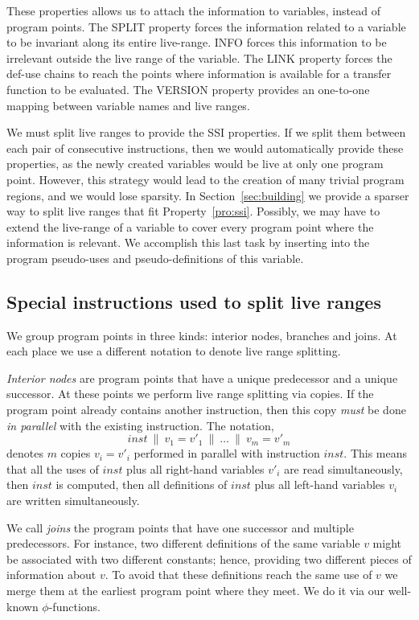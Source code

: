 These properties allows us to attach the information to variables, instead of program points.
The {SPLIT} property forces the information related to a variable to be invariant along its entire live-range.
{INFO} forces this information to be irrelevant outside the live range of the variable.
The {LINK} property forces the def-use chains to reach the points where information is available for a transfer function to be evaluated.
The {VERSION} property provides an one-to-one mapping between variable names and live ranges.

We must split live ranges to provide the SSI properties.
If we split them between each pair of consecutive instructions, then we would automatically provide these properties, as the newly created variables
would be live at only one program point.
However, this strategy would lead to the creation of many trivial program regions, and we would lose sparsity.
In Section~\ref{sec:building} we provide a sparser way to split live ranges that fit Property~\ref{pro:ssi}.
Possibly, we may have to extend the live-range of a variable to cover every program point where the information is relevant.
We accomplish this last task by inserting into the program pseudo-uses and pseudo-definitions of this variable.

\subsection{Special instructions used to split live ranges}
\label{sub:split}

We group program points in three kinds:
interior nodes, branches and joins.
At each place we use a different notation to denote live range splitting.

{\em Interior nodes} are program points that have a unique predecessor and a unique successor.
At these points we perform live range splitting via copies.
If the program point already contains another instruction, then this copy \emph{must} be done \emph{in parallel} with the existing instruction.
The notation, \[inst \ \parallel\  v_1=v'_1 \ \parallel\  \dots \ \parallel\  v_m=v'_m\] denotes $m$ copies $v_i=v'_i$ performed in parallel with
instruction $inst$.
This means that all the uses of $inst$ plus all right-hand variables $v'_i$ are read simultaneously, then $inst$ is computed, then all definitions of $inst$ plus all left-hand variables $v_i$ are written simultaneously.


We call {\em joins} the program points that have one successor and multiple predecessors.
For instance, two different definitions of the same variable $v$ might be associated with two different constants; hence, providing two different pieces of information about $v$.
To avoid that these definitions reach the same use of $v$ we merge them at the earliest program point where they meet.
We do it via our well-known $\phi$-functions.

